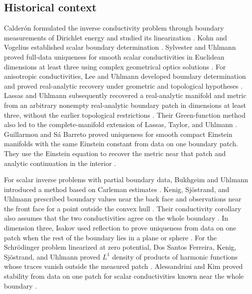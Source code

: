 \documentclass[11pt,a4paper]{article}
\theoremstyle{definition}
\theoremstyle{remark}
\numberwithin{equation}{section}
\begin{document}
\subsection{Historical context}

Calder\'on formulated the inverse conductivity problem through boundary
measurements of Dirichlet energy and studied its linearization
\cite{Calderon1980}. Kohn and Vogelius established scalar boundary
determination \cite{KohnVogelius1984}. Sylvester and Uhlmann proved
full-data uniqueness for smooth scalar conductivities in Euclidean
dimensions at least three using complex geometrical optics solutions
\cite{SylvesterUhlmann1987}. For anisotropic conductivities, Lee and
Uhlmann developed boundary determination and proved real-analytic
recovery under geometric and topological hypotheses
\cite{LeeUhlmann1989}. Lassas and Uhlmann subsequently recovered a
real-analytic manifold and metric from an arbitrary nonempty
real-analytic boundary patch in dimensions at least three, without
the earlier topological restrictions
\cite[Theorem~1.1(ii)]{LassasUhlmann2001}. Their Green-function method
also led to the complete-manifold extension of Lassas, Taylor, and
Uhlmann \cite{LassasTaylorUhlmann2003}. Guillarmou and S\'a Barreto
proved uniqueness for smooth compact Einstein manifolds with the same
Einstein constant from data on one boundary patch. They use the Einstein
equation to recover the metric near that patch and analytic continuation
in the interior \cite[Theorem~1.1]{GuillarmouSaBarreto2009}.

For scalar inverse problems with partial boundary data, Bukhgeim and
Uhlmann introduced a method based on Carleman estimates
\cite{BukhgeimUhlmann2002}. Kenig, Sj\"ostrand, and Uhlmann prescribed
boundary values near the back face and observations near the front
face for a point outside the convex hull
\cite[Theorem~1.1]{KenigSjostrandUhlmann2007}. Their conductivity
corollary also assumes that the two conductivities agree on the
whole boundary \cite[Corollary~1.4]{KenigSjostrandUhlmann2007}.
In dimension three, Isakov used reflection to prove uniqueness from
data on one patch when the rest of the boundary lies in a plane or
sphere \cite{Isakov2007}. For the Schr\"odinger problem linearized at
zero potential, Dos Santos Ferreira, Kenig, Sj\"ostrand, and Uhlmann
proved $L^1$ density of products of harmonic functions whose traces
vanish outside the measured patch
\cite[Theorem~1.1]{DosSantosFerreiraEtAl2009}. Alessandrini and Kim
proved stability from data on one patch for scalar conductivities
known near the whole boundary \cite[Theorem~2.5]{AlessandriniKim2012}.
\end{document}
